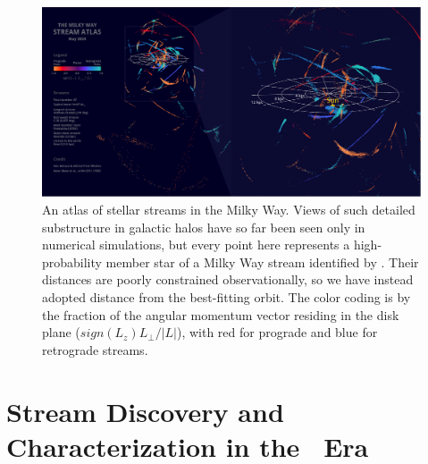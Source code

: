 \documentclass[final,5p,times,twocolumn,authoryear]{elsarticle}
\begin{document}
\begin{figure}[t!]
\begin{center}
\includegraphics[width=1\textwidth]{figures/fos_3d.pdf}
\end{center}
\caption{%
An atlas of stellar streams in the Milky Way.
Views of such detailed substructure in galactic halos have so far been seen only in numerical simulations, but every point here represents a high-probability member star of a Milky Way stream identified by \citet{ibata:2023, li:2019, vasiliev:2021}.
Their distances are poorly constrained observationally, so we have instead adopted distance from the best-fitting orbit.
The color coding is by the fraction of the angular momentum vector residing in the disk plane ($sign(L_z)L_\perp/|L|$), with red for prograde and blue for retrograde streams.
}
\label{fig:fos_3d}
\end{figure}

\section{Stream Discovery and Characterization in the \gaia\ Era}
\label{sec:discovery}

\end{document}
